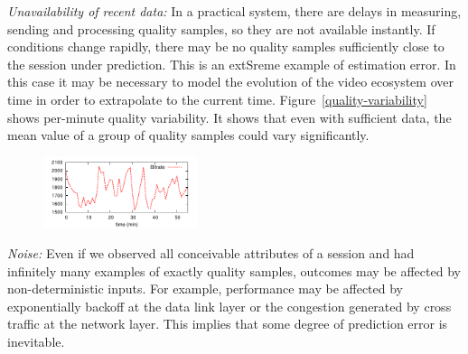 \begin{packedenumerate}
\item \emph{Unavailability of recent data:} In a practical system, there are delays in measuring, sending and processing quality samples, so they are not available instantly.  If conditions change rapidly, there may be no quality samples sufficiently close to the session under prediction.  This is an extSreme example of estimation error.  In this case it may be necessary to model the evolution of the video ecosystem over time in order to extrapolate to the current time. Figure~\ref{quality-variability} shows per-minute quality variability. It shows that even with sufficient data, the mean value of a group of quality samples could vary significantly.

\begin{figure}[h!]
\centering
 \includegraphics[width=0.4\textwidth] {figures/quality-time.pdf}
\label{fig:quality-variability}
\end{figure}

  \item \emph{Noise:} Even if we observed all conceivable attributes of a session and had infinitely many examples of exactly quality samples, outcomes may be affected by non-deterministic inputs.  For example, performance may be affected by exponentially backoff at the data link layer or the congestion generated by cross traffic at the network layer. This implies that some degree of prediction error is inevitable.
\end{packedenumerate}



